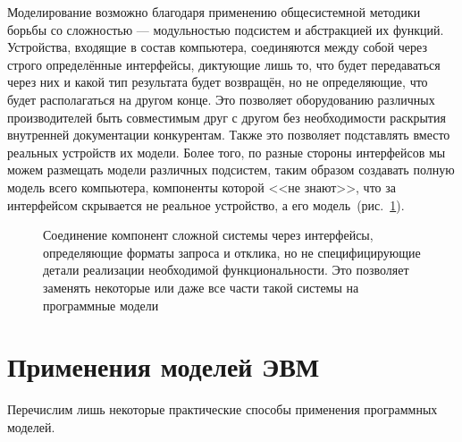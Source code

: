 \begin{digression}
Моделирование возможно благодаря применению общесистемной методики борьбы со сложностью --- модульностью подсистем и абстракцией их функций. Устройства, входящие в состав компьютера, соединяются между собой через строго определённые интерфейсы, диктующие лишь то, что будет передаваться через них и какой тип результата будет возвращён, но не определяющие, что будет располагаться на другом конце. Это позволяет оборудованию различных производителей быть совместимым друг с другом без необходимости раскрытия внутренней документации конкурентам. Также это позволяет подставлять вместо реальных устройств их модели. Более того, по разные стороны интерфейсов мы можем размещать модели различных подсистем, таким образом создавать полную модель всего компьютера, компоненты которой <<не знают>>, что за интерфейсом скрывается не реальное устройство, а его модель~(рис.~\ref{fig:interface}).

\end{digression}

\begin{figure}[htp]
\centering
{}
\caption[Соединение компонент сложной системы через интерфейсы]{Соединение компонент сложной системы через интерфейсы, определяющие форматы запроса и отклика, но не специфицирующие детали реализации необходимой функциональности. Это позволяет заменять некоторые или даже все части такой системы на программные модели}\label{fig:interface}
\end{figure}

\section{Применения моделей ЭВМ}

Перечислим лишь некоторые практические способы применения программных моделей.

